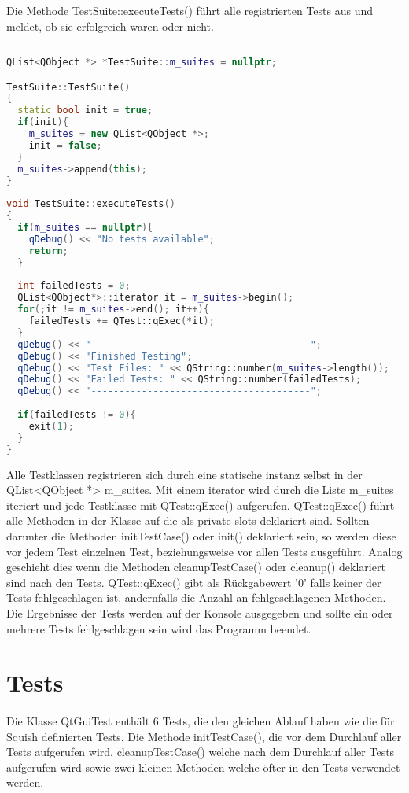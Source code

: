 		Die Methode TestSuite::executeTests() führt alle registrierten Tests aus und meldet, ob sie erfolgreich waren oder nicht.
		\begin{lstlisting}[language=C++, caption=testsuite.cpp]
			
QList<QObject *> *TestSuite::m_suites = nullptr;

TestSuite::TestSuite()
{
  static bool init = true;
  if(init){
    m_suites = new QList<QObject *>;
    init = false;
  }
  m_suites->append(this);
}
		
void TestSuite::executeTests()
{
  if(m_suites == nullptr){
    qDebug() << "No tests available";
    return;
  }
	
  int failedTests = 0;
  QList<QObject*>::iterator it = m_suites->begin();
  for(;it != m_suites->end(); it++){
  	failedTests += QTest::qExec(*it);
  }
  qDebug() << "---------------------------------------";
  qDebug() << "Finished Testing";
  qDebug() << "Test Files: " << QString::number(m_suites->length());
  qDebug() << "Failed Tests: " << QString::number(failedTests);
  qDebug() << "---------------------------------------";
	
  if(failedTests != 0){
    exit(1);
  }
}
\end{lstlisting}
		Alle Testklassen registrieren sich durch eine statische instanz selbst in der QList<QObject *> m\_suites. Mit einem iterator wird durch die Liste m\_suites iteriert und jede Testklasse mit QTest::qExec() aufgerufen. QTest::qExec() führt alle Methoden in der Klasse auf die als private slots deklariert sind. Sollten darunter die Methoden initTestCase() oder init() deklariert sein, so werden diese vor jedem Test einzelnen Test, beziehungsweise vor allen Tests ausgeführt. Analog geschieht dies wenn die Methoden cleanupTestCase() oder cleanup() deklariert sind nach den Tests. QTest::qExec() gibt als Rückgabewert '0' falls keiner der Tests fehlgeschlagen ist, andernfalls die Anzahl an fehlgeschlagenen Methoden. Die Ergebnisse der Tests werden auf der Konsole ausgegeben und sollte ein oder mehrere Tests fehlgeschlagen sein wird das Programm beendet.
		
		\newpage
		
		\section{Tests}
		\paragraph{} Die Klasse QtGuiTest enthält 6 Tests, die den gleichen Ablauf haben wie die für Squish definierten Tests. Die Methode initTestCase(), die vor dem Durchlauf aller Tests aufgerufen wird, cleanupTestCase() welche nach dem Durchlauf aller Tests aufgerufen wird sowie zwei kleinen Methoden welche öfter in den Tests verwendet werden.
		
